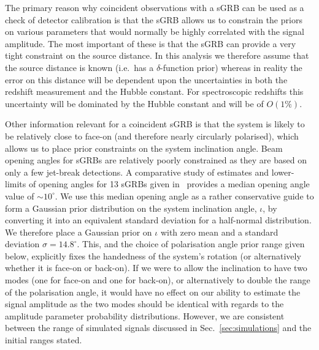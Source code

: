 \documentclass[prd, twocolumn, lengthcheck, superscriptaddress, showpacs, letterpaper, nofootinbib]{revtex4-1}
\begin{document}
The primary reason why coincident observations with a \ac{sGRB} can be used as
a check of detector calibration is that the \ac{sGRB} allows us to constrain
the priors on various parameters that would normally be highly correlated with
the signal amplitude. The most important of these is that the \ac{sGRB} can
provide a very tight constraint on the source distance. In this analysis we therefore
assume that the source distance is known (i.e.\ has a $\delta$-function
prior) whereas in reality the error on this distance will be dependent
upon the uncertainties in both the redshift measurement and the Hubble
constant. For spectroscopic redshifts this uncertainty will be dominated by the
Hubble constant and will be of $O(1\%)$.

Other information relevant for a coincident \ac{sGRB} is that the system is
likely to be relatively close to face-on (and therefore nearly circularly
polarised), which allows us to place prior constraints on the system
inclination angle. Beam opening angles for \acp{sGRB} are relatively poorly
constrained as they are based on only a few jet-break detections. A comparative
study of estimates and lower-limits of opening angles for 13 \acp{sGRB} given
in~\cite{2014ApJ...780..118F} provides a median opening angle value of $\sim
10^{\circ}$. We use this median opening angle as a rather conservative
guide to form a Gaussian prior distribution on the system inclination angle,
$\iota$, by converting it into an equivalent standard deviation for a
half-normal distribution. We therefore place a Gaussian prior on $\iota$ with
zero mean and a standard deviation $\sigma=14.8^{\circ}$. This, and the choice
of polarisation angle prior range given below, explicitly fixes the handedness
of the system's rotation (or alternatively whether it is face-on or back-on).
If we were to allow the inclination to have two modes (one for face-on and one
for back-on), or alternatively to double the range of the polarisation angle,
it would have no effect on our ability to estimate the signal amplitude as the
two modes should be identical with regards to the amplitude parameter
probability distributions. However, we are consistent between the range of
simulated signals discussed in Sec.~\ref{sec:simulations} and the initial
ranges stated.
\end{document}
